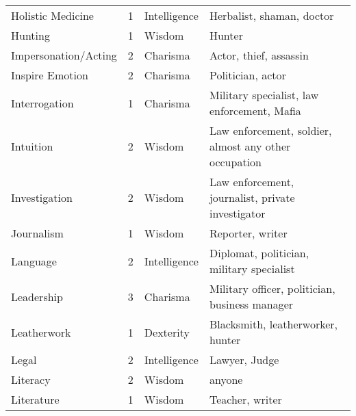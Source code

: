 \documentclass[twoside]{book}
\begin{document}
\begin{longtable}{p{1.25in}llp{12em}}
  \tabularnewline
      
  \raggedright
           Holistic Medicine 
  &
   1 
  &
   Intelligence 
  &
   Herbalist, shaman, doctor
           
  \tabularnewline
      
  \raggedright
           Hunting 
  &
   1 
  &
   Wisdom 
  &
   Hunter 
  \tabularnewline
      
  \raggedright
           Impersonation/Acting 
  &
   2 
  &
   Charisma 
  &
   Actor, thief, assassin
           
  \tabularnewline
      
  \raggedright
           Inspire Emotion 
  &
   2 
  &
   Charisma 
  &
   Politician, actor
           
  \tabularnewline
      
  \raggedright
           Interrogation 
  &
   1 
  &
   Charisma 
  &
   Military specialist, law
           enforcement, Mafia 
  \tabularnewline
      
  \raggedright
           Intuition 
  &
   2 
  &
   Wisdom 
  &
   Law enforcement, soldier,
           almost any other occupation 
  \tabularnewline
      
  \raggedright
           Investigation 
  &
   2 
  &
   Wisdom 
  &
   Law enforcement,
           journalist, private investigator 
  \tabularnewline
      
  \raggedright
           Journalism 
  &
   1 
  &
   Wisdom 
  &
   Reporter, writer 
  \tabularnewline
      
  \raggedright
           Language 
  &
   2 
  &
   Intelligence 
  &
   Diplomat, politician,
           military specialist 
  \tabularnewline
      
  \raggedright
           Leadership 
  &
   3 
  &
   Charisma 
  &
   Military officer,
           politician, business manager 
  \tabularnewline
      
  \raggedright
           Leatherwork 
  &
   1 
  &
   Dexterity 
  &
   Blacksmith,
           leatherworker, hunter 
  \tabularnewline
      
  \raggedright
           Legal 
  &
   2 
  &
   Intelligence 
  &
   Lawyer, Judge 
  \tabularnewline
      
  \raggedright
           Literacy 
  &
   2 
  &
   Wisdom 
  &
   anyone 
  \tabularnewline
      
  \raggedright
           Literature 
  &
   1 
  &
   Wisdom 
  &
   Teacher, writer 
  \tabularnewline
      

\end{longtable}
\end{document}
